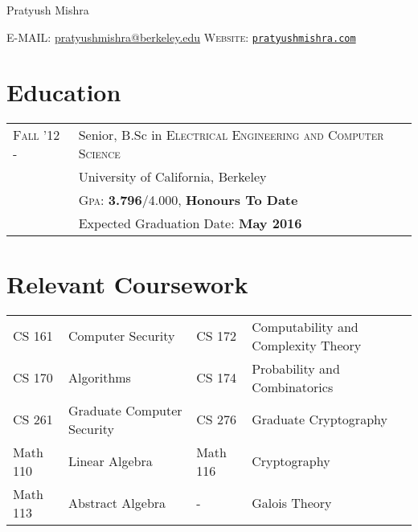 \documentclass[letter,10pt]{article}
\begin{document}
\pagestyle{empty} %


\par{\centering
		{\Huge Pratyush Mishra
	}\bigskip\par}


\textsc{E-MAIL:} \href{mailto:pratyushmishra@berkeley.edu}{pratyushmishra@berkeley.edu}
        \hfill
        \textsc{Website:} \href{http://www.pratyushmishra.com}{\texttt{pratyushmishra.com}}
\section{Education}
\begin{tabular}{R{2.5cm}p{11cm}}	

  \textsc{Fall '12 - } & Senior, B.Sc in \textsc{Electrical Engineering and Computer Science} \\
                       & University of California, Berkeley \\
                       & \textsc{Gpa:} \textbf{3.796}/4.000, \textbf{Honours To Date} \\
                       & Expected Graduation Date: \textbf{May 2016}\\
\end{tabular}

\section{Relevant Coursework}
\begin{tabular}{R{2.5cm}p{4.5cm}R{2cm}p{6cm}}	

  CS 161   & Computer Security          & CS 172   & Computability and Complexity Theory\\
  CS 170   & Algorithms                 & CS 174   & Probability and Combinatorics\\
  CS 261   & Graduate Computer Security & CS 276   & Graduate Cryptography\\
  Math 110 & Linear Algebra             & Math 116 & Cryptography\\
  Math 113 & Abstract Algebra           & -       & Galois Theory\\
\end{tabular}



\end{document}

